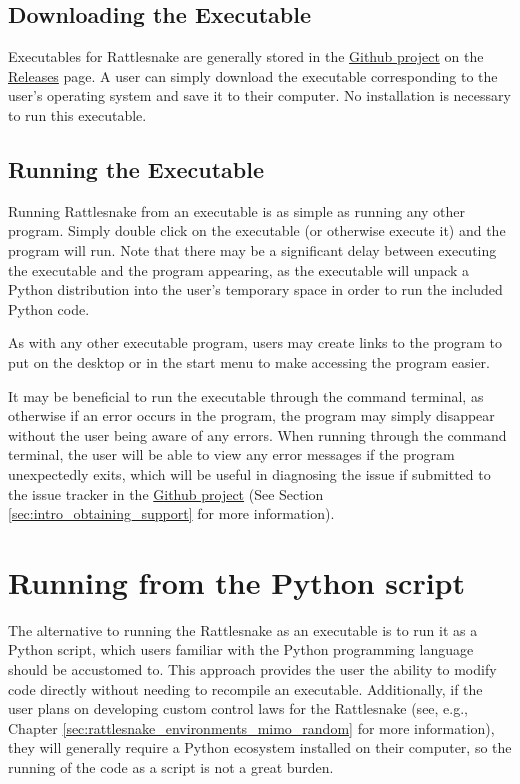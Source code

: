 \documentclass[pdf,12pt,report]{SANDreport}
\newcommand{\GitlabProject}{\href{https://github.com/sandialabs/rattlesnake-vibration-controller}{Github project}}
\newcommand{\GitlabReleasesPage}{\href{https://github.com/sandialabs/rattlesnake-vibration-controller/releases}{Releases}}
\begin{document}
    \subsection{Downloading the Executable}
    Executables for Rattlesnake are generally stored in the \GitlabProject{} on the \GitlabReleasesPage{} page.  A user can simply download the executable corresponding to the user's operating system and save it to their computer.  No installation is necessary to run this executable.
    
    \subsection{Running the Executable}
    Running Rattlesnake from an executable is as simple as running any other program.  Simply double click on the executable (or otherwise execute it) and the program will run.  Note that there may be a significant delay between executing the executable and the program appearing, as the executable will unpack a Python distribution into the user's temporary space in order to run the included Python code.
    
    As with any other executable program, users may create links to the program to put on the desktop or in the start menu to make accessing the program easier.
    
    It may be beneficial to run the executable through the command terminal, as otherwise if an error occurs in the program, the program may simply disappear without the user being aware of any errors.  When running through the command terminal, the user will be able to view any error messages if the program unexpectedly exits, which will be useful in diagnosing the issue if submitted to the issue tracker in the \GitlabProject{} (See Section \ref{sec:intro_obtaining_support} for more information).
    
    \section{Running from the Python script}
    The alternative to running the Rattlesnake as an executable is to run it as a Python script, which users familiar with the Python programming language should be accustomed to.  This approach provides the user the ability to modify code directly without needing to recompile an executable.  Additionally, if the user plans on developing custom control laws for the Rattlesnake (see, e.g., Chapter \ref{sec:rattlesnake_environments_mimo_random} for more information), they will generally require a Python ecosystem installed on their computer, so the running of the code as a script is not a great burden.
    
\end{document}
